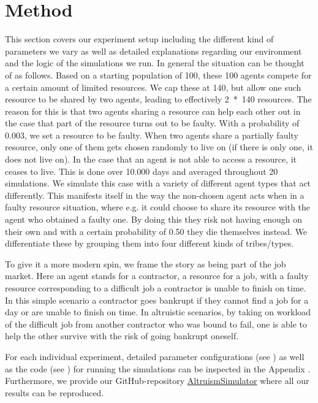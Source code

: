 \documentclass[sigconf]{acmart}
\newcommand{\VNumSimulations}{20\xspace}
\newcommand{\VNumDays}{10.000\xspace}
\newcommand{\VNumPop}{100\xspace}
\newcommand{\VNumTrees}{140\xspace}
\newcommand{\VProbPredator}{0.003\xspace}
\newcommand{\VProbAltruistDies}{0.50\xspace}
\begin{document}
    \section{Method}\label{sec:method}
    This section covers our experiment setup including the different kind of parameters we vary as well as detailed explanations regarding our environment and the logic of the simulations we run.
    In general the situation can be thought of as follows.
    Based on a starting population of \VNumPop, these \VNumPop agents compete for a certain amount of limited resources.
    We cap these at \VNumTrees, but allow one such resource to be shared by two agents, leading to effectively 2~*~\VNumTrees resources.
    The reason for this is that two agents sharing a resource can help each other out in the case that part of the resource turns out to be faulty.
    With a probability of \VProbPredator, we set a resource to be faulty.
    When two agents share a partially faulty resource, only one of them gets chosen randomly to live on (if there is only one, it does not live on).
    In the case that an agent is not able to access a resource, it ceases to live.
    This is done over \VNumDays days and averaged throughout \VNumSimulations simulations.
    We simulate this case with a variety of different agent types that act differently.
    This manifests itself in the way the non-chosen agent acts when in a faulty resource situation, where e.g. it could choose to share its resource with the agent who obtained a faulty one.
    By doing this they risk not having enough on their own and with a certain probability of \VProbAltruistDies they die themselves instead.
    We differentiate these by grouping them into four different kinds of tribes/types.

    To give it a more modern spin, we frame the story as being part of the job market.
    Here an agent stands for a contractor, a resource for a job, with a faulty resource corresponding to a difficult job a contractor is unable to finish on time.
    In this simple scenario a contractor goes bankrupt if they cannot find a job for a day or are unable to finish on time.
    In altruistic scenarios, by taking on workload of the difficult job from another contractor who was bound to fail, one is able to help the other survive with the risk of going bankrupt oneself.

    For each individual experiment, detailed parameter configurations (see ) as well as the code (see ) for running the simulations can be inspected in the Appendix .
    Furthermore, we provide our GitHub-repository {\color{blue}\href{https://github.com/RafaelSterzinger/AltruismSimulator}{AltruismSimulator}} where all our results can be reproduced.
\end{document}
